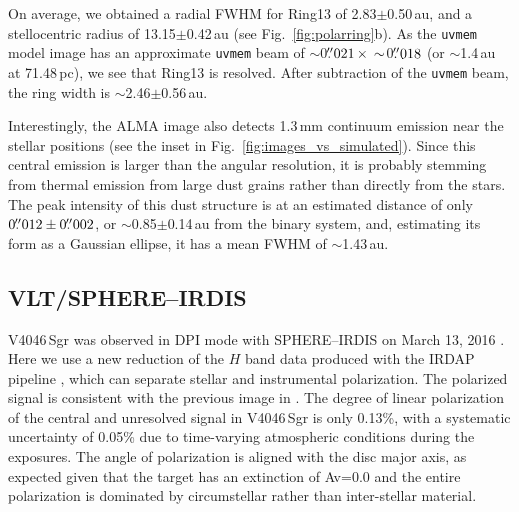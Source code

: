 \documentclass[fleqn,usenatbib,useAMS]{mnras}
\begin{document}
On average, we obtained a radial FWHM for Ring13 of 2.83$\pm$0.50\,au, and a stellocentric radius of 13.15$\pm$0.42\,au (see Fig.~\ref{fig:polarring}b). As the {\tt uvmem} model image has an approximate {\tt uvmem} beam of $\sim$0$\hbox{$.\!\!^{\prime\prime}$}021 \,\times \,\sim$0$\hbox{$.\!\!^{\prime\prime}$}018$ (or $\sim$1.4\,au at 71.48\,pc), we see that Ring13 is resolved. After subtraction of the {\tt uvmem} beam, the ring width is $\sim$2.46$\pm$0.56\,au.

Interestingly, the ALMA image also detects 1.3\,mm continuum emission near the stellar positions (see the inset in Fig.~\ref{fig:images_vs_simulated}). Since this central emission is larger than the angular resolution, it is probably stemming from thermal emission from large dust grains rather than directly from the stars. The peak intensity of this dust structure is at an estimated distance of only $0\hbox{$.\!\!^{\prime\prime}$}012\pm0\hbox{$.\!\!^{\prime\prime}$}002$, or $\sim$0.85$\pm$0.14\,au from the binary system, and, estimating its form as a Gaussian ellipse, it has a mean FWHM of $\sim$1.43\,au.


\subsection{VLT/SPHERE--IRDIS}  \label{subsec:SPHERE}

V4046\,Sgr was observed in DPI mode with SPHERE--IRDIS on March 13, 2016 \citep[see][for details]{Avenhaus_2018}. Here we use a new reduction of the $H$ band data produced with the IRDAP pipeline \citep{2020A&A...633A..64V}, which can separate stellar and instrumental polarization. The polarized signal is consistent with the previous image in \citet{Avenhaus_2018}. The degree of linear polarization of the central and unresolved signal in V4046\,Sgr is only 0.13\%, with a systematic uncertainty of 0.05\% due to time-varying atmospheric conditions during the exposures. The angle of polarization is aligned with the disc major axis, as expected given that the target has an extinction of Av=0.0 \citep{2016ApJ...828...69M} and the entire polarization is dominated by circumstellar rather than inter-stellar material.
\end{document}
